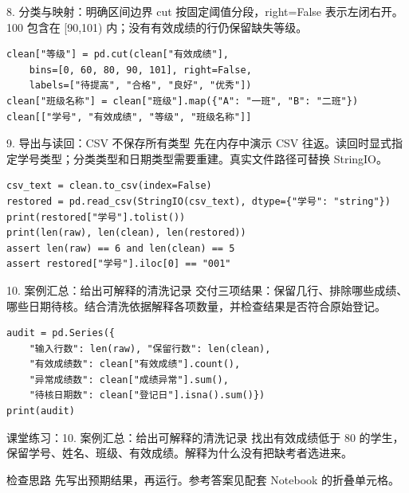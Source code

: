 \documentclass[9pt]{ctexbeamer}
\begin{document}
\begin{frame}[fragile]{8. 分类与映射：明确区间边界}
\small cut 按固定阈值分段，right=False 表示左闭右开。100 包含在 [90,101) 内；没有有效成绩的行仍保留缺失等级。
\medskip
\begin{lstlisting}
clean["等级"] = pd.cut(clean["有效成绩"],
    bins=[0, 60, 80, 90, 101], right=False,
    labels=["待提高", "合格", "良好", "优秀"])
clean["班级名称"] = clean["班级"].map({"A": "一班", "B": "二班"})
clean[["学号", "有效成绩", "等级", "班级名称"]]
\end{lstlisting}
\end{frame}

\begin{frame}[fragile]{9. 导出与读回：CSV 不保存所有类型}
\small 先在内存中演示 CSV 往返。读回时显式指定学号类型；分类类型和日期类型需要重建。真实文件路径可替换 StringIO。
\medskip
\begin{lstlisting}
csv_text = clean.to_csv(index=False)
restored = pd.read_csv(StringIO(csv_text), dtype={"学号": "string"})
print(restored["学号"].tolist())
print(len(raw), len(clean), len(restored))
assert len(raw) == 6 and len(clean) == 5
assert restored["学号"].iloc[0] == "001"
\end{lstlisting}
\end{frame}

\begin{frame}[fragile]{10. 案例汇总：给出可解释的清洗记录}
\small 交付三项结果：保留几行、排除哪些成绩、哪些日期待核。结合清洗依据解释各项数量，并检查结果是否符合原始登记。
\medskip
\begin{lstlisting}
audit = pd.Series({
    "输入行数": len(raw), "保留行数": len(clean),
    "有效成绩数": clean["有效成绩"].count(),
    "异常成绩数": clean["成绩异常"].sum(),
    "待核日期数": clean["登记日"].isna().sum()})
print(audit)
\end{lstlisting}
\end{frame}
\begin{frame}[fragile]{课堂练习：10. 案例汇总：给出可解释的清洗记录}
找出有效成绩低于 80 的学生，保留学号、姓名、班级、有效成绩。解释为什么没有把缺考者选进来。
\medskip
\begin{block}{检查思路}
先写出预期结果，再运行。参考答案见配套 Notebook 的折叠单元格。
\end{block}
\end{frame}
\end{document}
